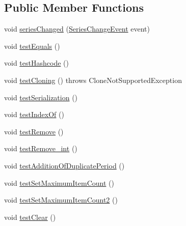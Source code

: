 \subsection*{Public Member Functions}
\begin{DoxyCompactItemize}
\item 
void \mbox{\hyperlink{classorg_1_1jfree_1_1data_1_1time_1_1ohlc_1_1_o_h_l_c_series_test_a4a44187607adc569862f1a987c53926a}{series\+Changed}} (\mbox{\hyperlink{classorg_1_1jfree_1_1data_1_1general_1_1_series_change_event}{Series\+Change\+Event}} event)
\item 
void \mbox{\hyperlink{classorg_1_1jfree_1_1data_1_1time_1_1ohlc_1_1_o_h_l_c_series_test_ac97d4bd281315c63a6df99f8e2aeb1b1}{test\+Equals}} ()
\item 
void \mbox{\hyperlink{classorg_1_1jfree_1_1data_1_1time_1_1ohlc_1_1_o_h_l_c_series_test_a8cfd9ede8e796f7b378c6b5287ae3743}{test\+Hashcode}} ()
\item 
void \mbox{\hyperlink{classorg_1_1jfree_1_1data_1_1time_1_1ohlc_1_1_o_h_l_c_series_test_a8b19ef848a2eb9c3f56e16a7ceb43879}{test\+Cloning}} ()  throws Clone\+Not\+Supported\+Exception 
\item 
void \mbox{\hyperlink{classorg_1_1jfree_1_1data_1_1time_1_1ohlc_1_1_o_h_l_c_series_test_ae3597a424eee994a0abb1c64a3d3e8ef}{test\+Serialization}} ()
\item 
void \mbox{\hyperlink{classorg_1_1jfree_1_1data_1_1time_1_1ohlc_1_1_o_h_l_c_series_test_a24e9e9238a227514345102730032b546}{test\+Index\+Of}} ()
\item 
void \mbox{\hyperlink{classorg_1_1jfree_1_1data_1_1time_1_1ohlc_1_1_o_h_l_c_series_test_adbc649ac0009c8f315286e7e0f00aeef}{test\+Remove}} ()
\item 
void \mbox{\hyperlink{classorg_1_1jfree_1_1data_1_1time_1_1ohlc_1_1_o_h_l_c_series_test_a0925fad0eb5081f1816c9849c3ed302f}{test\+Remove\+\_\+int}} ()
\item 
void \mbox{\hyperlink{classorg_1_1jfree_1_1data_1_1time_1_1ohlc_1_1_o_h_l_c_series_test_aed5e566df8df3080ad6c9624da15e52f}{test\+Addition\+Of\+Duplicate\+Period}} ()
\item 
void \mbox{\hyperlink{classorg_1_1jfree_1_1data_1_1time_1_1ohlc_1_1_o_h_l_c_series_test_a38de4b6cb7f0e866dda1883718b3a7a3}{test\+Set\+Maximum\+Item\+Count}} ()
\item 
void \mbox{\hyperlink{classorg_1_1jfree_1_1data_1_1time_1_1ohlc_1_1_o_h_l_c_series_test_a7e97b0bb19ca68a20bf48cd66a337e15}{test\+Set\+Maximum\+Item\+Count2}} ()
\item 
void \mbox{\hyperlink{classorg_1_1jfree_1_1data_1_1time_1_1ohlc_1_1_o_h_l_c_series_test_a43e47a5b5fdd9cb246e35e224773b27d}{test\+Clear}} ()
\end{DoxyCompactItemize}


